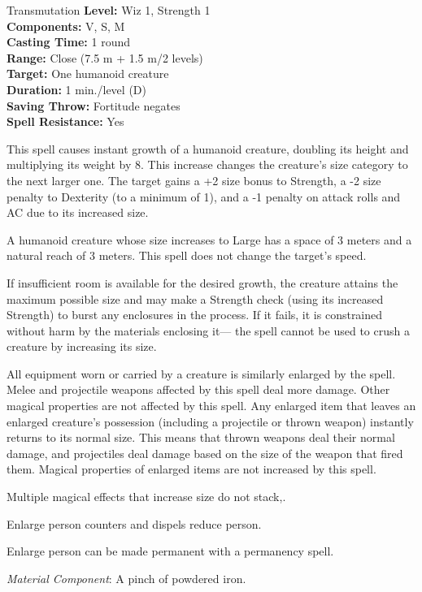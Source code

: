 {Transmutation}
{
	\textbf{Level:}
	Wiz 1, Strength 1\\
	\textbf{Components:}
	V, S, M\\
	\textbf{Casting Time:}
	1 round\\
	\textbf{Range:}
	Close (7.5 m + 1.5 m/2 levels)\\
	\textbf{Target:}
	One humanoid creature\\
	\textbf{Duration:}
	1 min./level (D)\\
	\textbf{Saving Throw:}
	Fortitude negates\\
	\textbf{Spell Resistance:}
	Yes\\
}
{
	This spell causes instant growth of a humanoid creature, doubling its height and multiplying its weight by 8. This increase changes the creature's size category to the next larger one. The target gains a +2 size bonus to Strength, a -2 size penalty to Dexterity (to a minimum of 1), and a -1 penalty on attack rolls and AC due to its increased size.

	A humanoid creature whose size increases to Large has a space of 3 meters and a natural reach of 3 meters. This spell does not change the target's speed.

	If insufficient room is available for the desired growth, the creature attains the maximum possible size and may make a Strength check (using its increased Strength) to burst any enclosures in the process. If it fails, it is constrained without harm by the materials enclosing it--- the spell cannot be used to crush a creature by increasing its size.

	All equipment worn or carried by a creature is similarly enlarged by the spell. Melee and projectile weapons affected by this spell deal more damage. Other magical properties are not affected by this spell. Any enlarged item that leaves an enlarged creature's possession (including a projectile or thrown weapon) instantly returns to its normal size. This means that thrown weapons deal their normal damage, and projectiles deal damage based on the size of the weapon that fired them. Magical properties of enlarged items are not increased by this spell.

	Multiple magical effects that increase size do not stack,.

	Enlarge person counters and dispels reduce person.

	Enlarge person can be made permanent with a permanency spell.

	\textit{Material Component}:
	A pinch of powdered iron.

}
